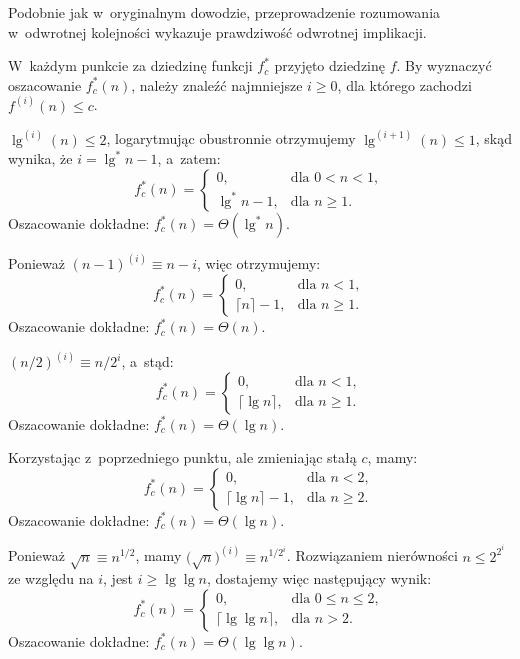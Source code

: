 Podobnie jak w~oryginalnym dowodzie, przeprowadzenie rozumowania w~odwrotnej kolejności wykazuje prawdziwość odwrotnej implikacji.

W~każdym punkcie za dziedzinę funkcji $f_c^*$ przyjęto dziedzinę $f$. By wyznaczyć oszacowanie $f_c^*(n)$, należy znaleźć najmniejsze $i\ge0$, dla którego zachodzi $f^{(i)}(n)\le c$.

\subexercise{} %
$\lg^{(i)}(n)\le2$, logarytmując obustronnie otrzymujemy $\lg^{(i+1)}(n)\le1$, skąd wynika, że $i=\lg^*n-1$, a~zatem:
\[
	f_c^*(n) =
	\begin{cases}
		0, & \text{dla $0<n<1$}, \\
		\lg^*n-1, & \text{dla $n\ge1$}.
	\end{cases}
\]
Oszacowanie dokładne: $f_c^*(n)=\Theta(\lg^*n)$.

\subexercise{} %
Ponieważ $(n-1)^{(i)}\equiv n-i$, więc otrzymujemy:
\[
	f_c^*(n) =
	\begin{cases}
		0, & \text{dla $n<1$}, \\
		\lceil n\rceil-1, & \text{dla $n\ge1$}.
	\end{cases}
\]
Oszacowanie dokładne: $f_c^*(n)=\Theta(n)$.

\subexercise{} %
$(n/2)^{(i)}\equiv n/2^i$, a~stąd:
\[
	f_c^*(n) =
	\begin{cases}
		0, & \text{dla $n<1$}, \\
		\lceil\lg n\rceil, & \text{dla $n\ge1$}.
	\end{cases}
\]
Oszacowanie dokładne: $f_c^*(n)=\Theta(\lg n)$.

\subexercise{} %
Korzystając z~poprzedniego punktu, ale zmieniając stałą $c$, mamy:
\[
	f_c^*(n) =
	\begin{cases}
		0, & \text{dla $n<2$}, \\
		\lceil\lg n\rceil-1, & \text{dla $n\ge2$}.
	\end{cases}
\]
Oszacowanie dokładne: $f_c^*(n)=\Theta(\lg n)$.

\subexercise{} %
Ponieważ $\sqrt{n}\equiv n^{1/2}$, mamy $\bigl(\!\sqrt{n}\bigr)^{(i)}\equiv n^{1/2^i}$\!. Rozwiązaniem nierówności $n\le2^{2^i}$ ze względu na $i$, jest $i\ge\lg\lg n$, dostajemy więc następujący wynik:
\[
	f_c^*(n) =
	\begin{cases}
		0, & \text{dla $0\le n\le2$}, \\
		\lceil\lg\lg n\rceil, & \text{dla $n>2$}.
	\end{cases}
\]
Oszacowanie dokładne: $f_c^*(n)=\Theta(\lg\lg n)$.

